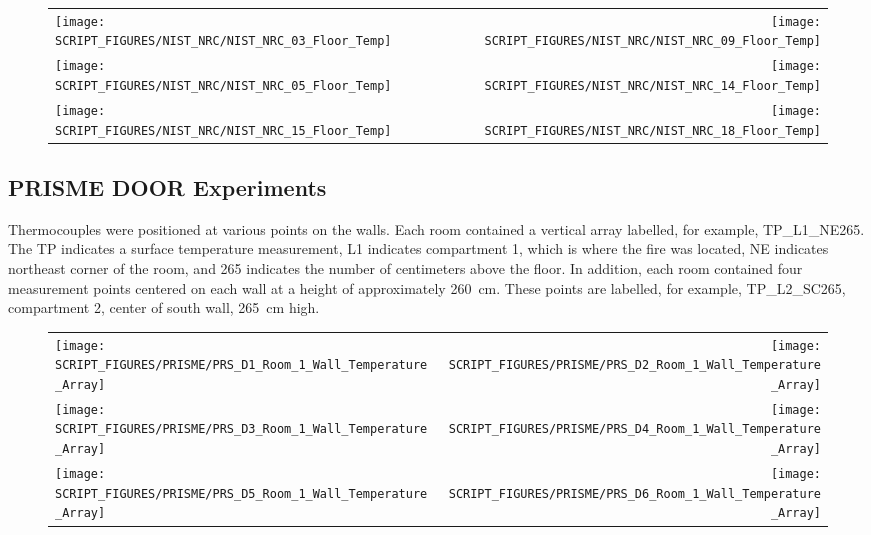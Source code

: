 \begin{figure}[p]
\begin{tabular*}{\textwidth}{l@{\extracolsep{\fill}}r}
\texttt{[image: SCRIPT\_FIGURES/NIST\_NRC/NIST\_NRC\_03\_Floor\_Temp]} &
\texttt{[image: SCRIPT\_FIGURES/NIST\_NRC/NIST\_NRC\_09\_Floor\_Temp]} \\
\texttt{[image: SCRIPT\_FIGURES/NIST\_NRC/NIST\_NRC\_05\_Floor\_Temp]} &
\texttt{[image: SCRIPT\_FIGURES/NIST\_NRC/NIST\_NRC\_14\_Floor\_Temp]} \\
\texttt{[image: SCRIPT\_FIGURES/NIST\_NRC/NIST\_NRC\_15\_Floor\_Temp]} &
\texttt{[image: SCRIPT\_FIGURES/NIST\_NRC/NIST\_NRC\_18\_Floor\_Temp]}
\end{tabular*}
\label{NIST_NRC_Floor_Temp_Open}
\end{figure}

\clearpage

\subsection{PRISME DOOR Experiments}

Thermocouples were positioned at various points on the walls. Each room contained a vertical array labelled, for example, TP\_L1\_NE265. The TP indicates a surface temperature measurement, L1 indicates compartment 1, which is where the fire was located, NE indicates northeast corner of the room, and 265 indicates the number of centimeters above the floor. In addition, each room contained four measurement points centered on each wall at a height of approximately 260~cm. These points are labelled, for example, TP\_L2\_SC265, compartment 2, center of south wall, 265~cm high.

\begin{figure}[!ht]
\begin{tabular*}{\textwidth}{l@{\extracolsep{\fill}}r}
\texttt{[image: SCRIPT\_FIGURES/PRISME/PRS\_D1\_Room\_1\_Wall\_Temperature\_Array]} &
\texttt{[image: SCRIPT\_FIGURES/PRISME/PRS\_D2\_Room\_1\_Wall\_Temperature\_Array]} \\
\texttt{[image: SCRIPT\_FIGURES/PRISME/PRS\_D3\_Room\_1\_Wall\_Temperature\_Array]} &
\texttt{[image: SCRIPT\_FIGURES/PRISME/PRS\_D4\_Room\_1\_Wall\_Temperature\_Array]} \\
\texttt{[image: SCRIPT\_FIGURES/PRISME/PRS\_D5\_Room\_1\_Wall\_Temperature\_Array]} &
\texttt{[image: SCRIPT\_FIGURES/PRISME/PRS\_D6\_Room\_1\_Wall\_Temperature\_Array]}
\end{tabular*}
\label{PRISME_Wall_Array_Room_1}
\end{figure}

